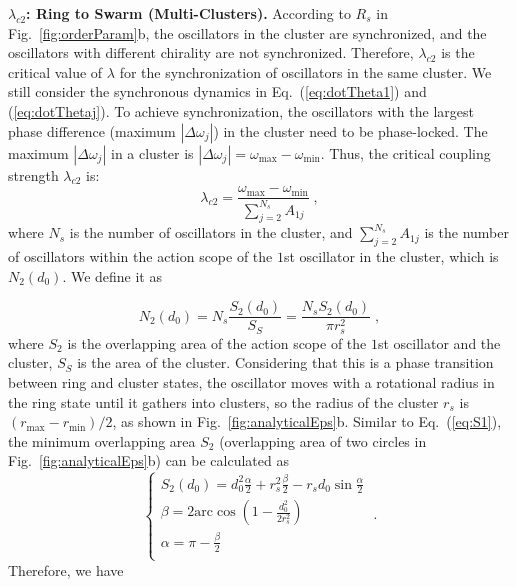 \documentclass[%
 aip,
 amsmath,amssymb,
 reprint,%
]{revtex4-1}
\begin{document}
\vspace{0.25cm}
\noindent\textbf{$\lambda_{c2}$: Ring to Swarm (Multi-Clusters).} According to $R_s$ in Fig.~\ref{fig:orderParam}b, the oscillators in the cluster are synchronized, and the oscillators with different chirality are not synchronized. Therefore, $\lambda_{c2}$ is the critical value of $\lambda$ for the synchronization of oscillators in the same cluster. We still consider the synchronous dynamics in Eq.~(\ref{eq:dotTheta1}) and (\ref{eq:dotThetaj}). To achieve synchronization, the oscillators with the largest phase difference (maximum $\left| \Delta \omega _j \right|$) in the cluster need to be phase-locked. The maximum $\left| \Delta \omega _j \right|$ in a cluster is $\left| \Delta \omega _j \right|=\omega _{\max}-\omega _{\min}$. Thus, the critical coupling strength $\lambda_{c2}$ is:
\begin{equation}
    \lambda _{c2}=\frac{\omega _{\max}-\omega _{\min}}{\sum\nolimits_{j=2}^{N_s}{A_{1j}}}\;,
\end{equation}
where $N_s$ is the number of oscillators in the cluster, and $\sum\nolimits_{j=2}^{N_s}{A_{1j}}$ is the number of oscillators within the action scope of the $1$st oscillator in the cluster, which is $N_2\left( d_0 \right)$. We define it as

\begin{equation}
    N_2\left( d_0 \right) =N_s\frac{S_2\left( d_0 \right)}{S_S}=\frac{N_sS_2\left( d_0 \right)}{\pi r_{s}^{2}}\;,
\end{equation}
where $S_2$ is the overlapping area of the action scope of the $1$st oscillator and the cluster, $S_S$ is the area of the cluster. Considering that this is a phase transition between ring and cluster states, the oscillator moves with a rotational radius in the ring state until it gathers into clusters, so the radius of the cluster $r_s$ is $(r_{\max}-r_{\min})/2$, as shown in Fig.~\ref{fig:analyticalEps}b. Similar to Eq.~(\ref{eq:S1}), the minimum overlapping area $S_2$ (overlapping area of two circles in Fig.~\ref{fig:analyticalEps}b) can be calculated as
\begin{equation}
    \begin{cases}
        S_2\left( d_0 \right) =d_{0}^{2}\frac{\alpha}{2}+r_{s}^{2}\frac{\beta}{2}-r_sd_0\sin \frac{\alpha}{2}\\
        \beta =2\mathrm{arc}\cos \left( 1-\frac{d_{0}^{2}}{2r_{s}^{2}} \right)\\
        \alpha =\pi -\frac{\beta}{2}\\
    \end{cases}\;.
\end{equation}
Therefore, we have
\end{document}
